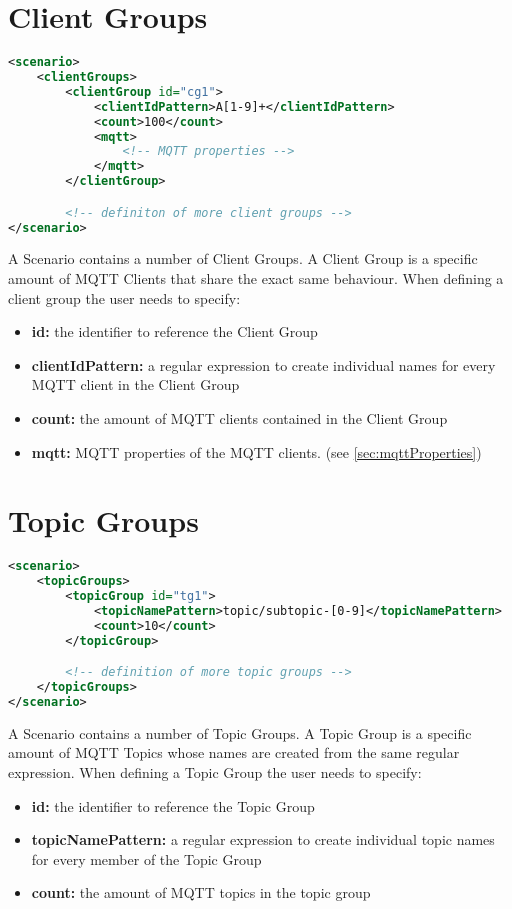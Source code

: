 \section{Client Groups}
\begin{lstlisting}[caption={XML defininition of Client Groups}, captionpos=b, label={lst:clientGroups}, language=XML]
<scenario>
	<clientGroups>
		<clientGroup id="cg1">
			<clientIdPattern>A[1-9]+</clientIdPattern>
			<count>100</count>
			<mqtt>
				<!-- MQTT properties -->
			</mqtt>
		</clientGroup>

		<!-- definiton of more client groups -->
</scenario>
\end{lstlisting}
A Scenario contains a number of Client Groups.
A Client Group is a specific amount of MQTT Clients that share the exact same behaviour.
When defining a client group the user needs to specify:
\begin{itemize}
	\item \textbf{id:} the identifier to reference the Client Group 
	\item \textbf{clientIdPattern:} a regular expression to create individual names for every MQTT client in the Client Group
	\item \textbf{count:} the amount of MQTT clients contained in the Client Group
	\item \textbf{mqtt:} MQTT properties of the MQTT clients. (see \ref{sec:mqttProperties})
\end{itemize}

\section{Topic Groups}
\begin{lstlisting}[caption={XMl definition of Topic Groups}, captionpos=b, label={lst:topicGroups}, language=XML]
<scenario>
	<topicGroups>
		<topicGroup id="tg1">
			<topicNamePattern>topic/subtopic-[0-9]</topicNamePattern>
			<count>10</count>
		</topicGroup>

		<!-- definition of more topic groups -->
	</topicGroups>
</scenario>
\end{lstlisting}
A Scenario contains a number of Topic Groups.
A Topic Group is a specific amount of MQTT Topics whose names are created from the same regular expression.
When defining a Topic Group the user needs to specify:
\begin{itemize}
	\item \textbf{id:} the identifier to reference the Topic Group
	\item \textbf{topicNamePattern:} a regular expression to create individual topic names for every member of the Topic Group
	\item \textbf{count:} the amount of MQTT topics in the topic group
\end{itemize}

